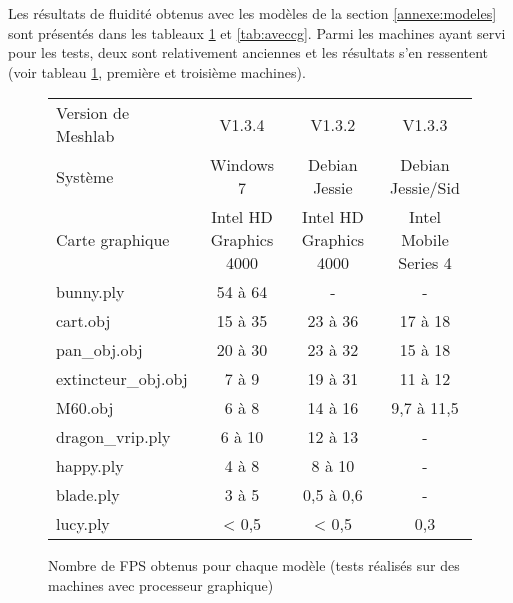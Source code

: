 Les résultats de fluidité obtenus avec les modèles de la section \ref{annexe:modeles} sont présentés dans les tableaux \ref{tab:avecprocgraphique} et \ref{tab:aveccg}. Parmi les machines ayant servi pour les tests, deux sont relativement anciennes et les résultats s'en ressentent (voir tableau \ref{tab:avecprocgraphique}, première et troisième machines).

\begin{figure}[h]
  \begin{changemargin}{-4cm}{-4cm}
    \centering
    \begin{tabular}{|l|c|c|c|}
      \hline
      Version de Meshlab & V1.3.4 & V1.3.2 & V1.3.3 \\
      Système & Windows 7 & Debian Jessie & Debian Jessie/Sid \\
      Carte graphique & Intel HD Graphics 4000 & Intel HD Graphics 4000 & Intel Mobile Series 4 \\ \hline \hline
      bunny.ply & 54 à 64 & - & - \\ \hline
      cart.obj & 15 à 35 & 23 à 36 & 17 à 18 \\ \hline
      pan\_obj.obj & 20 à 30 & 23 à 32 & 15 à 18 \\ \hline
      extincteur\_obj.obj & 7 à 9 & 19 à 31 & 11 à 12 \\ \hline
      M60.obj & 6 à 8 & 14 à 16 & 9,7 à 11,5 \\ \hline
      dragon\_vrip.ply & 6 à 10 & 12 à 13 & - \\ \hline
      happy.ply & 4 à 8 & 8 à 10 & - \\ \hline
      blade.ply & 3 à 5 & 0,5 à 0,6 & - \\ \hline
      lucy.ply & < 0,5 & < 0,5 & 0,3 \\ \hline
    \end{tabular}
  \end{changemargin}
  \caption{Nombre de FPS obtenus pour chaque modèle (tests réalisés sur des machines avec processeur graphique)}
  \label{tab:avecprocgraphique}
\end{figure}


